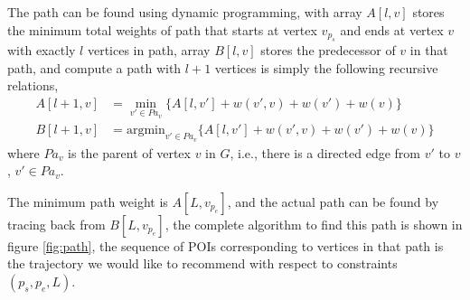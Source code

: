 \documentclass{sig-alternate-05-2015}
\begin{document}
The path can be found using dynamic programming, 
with array $A[l, v]$ stores the minimum total weights of path 
that starts at vertex $v_{p_s}$ and ends at vertex $v$ with 
exactly $l$ vertices in path,
array $B[l, v]$ stores the predecessor of $v$ in that path,
and compute a path with $l+1$ vertices is simply the following recursive relations,
\begin{align*}
    A[l+1, v] &= \min_{v' \in Pa_v} \{ A[l, v'] + w(v', v) + w(v') + w(v) \} \\
    B[l+1, v] &= \text{argmin}_{v' \in Pa_v} \{ A[l, v'] + w(v', v) + w(v') + w(v) \} 
\end{align*}
where $Pa_v$ is the parent of vertex $v$ in $G$,
i.e., 
there is a directed edge from $v'$ to $v$, $v' \in Pa_v$.

The minimum path weight is $A[L, v_{p_e}]$,
and the actual path can be found by tracing back from $B[L, v_{p_e}]$,
the complete algorithm to find this path is shown in figure \ref{fig:path},
the sequence of POIs corresponding to vertices in that path is the 
trajectory we would like to recommend with respect to constraints $(p_s, p_e, L)$.
\end{document}
